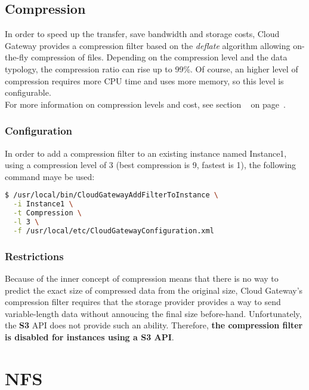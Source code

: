\documentclass[11pt,fleqn,openany]{book} %
\begin{document}
\subsection{Compression}

In order to speed up the transfer, save bandwidth and storage costs, Cloud Gateway provides a compression filter based on the \textit{deflate} algorithm
allowing on-the-fly compression of files. Depending on the compression level and the data typology, the compression ratio can rise up to 99\%.
Of course, an higher level of compression requires more CPU time and uses more memory, so this level is configurable.\\

For more information on compression levels and cost, see section ~ on page~\pageref{sec:performance-compression}.

\subsubsection{Configuration}

In order to add a compression filter to an existing instance named Instance1, using a compression level of 3 (best compression is 9, fastest is 1), the following command maye be used:

\begin{lstlisting}[language=bash]
$ /usr/local/bin/CloudGatewayAddFilterToInstance \
  -i Instance1 \
  -t Compression \
  -l 3 \
  -f /usr/local/etc/CloudGatewayConfiguration.xml
\end{lstlisting}

\subsubsection{Restrictions}

Because of the inner concept of compression means that there is no way to predict the exact size of compressed data from the original size,
Cloud Gateway's compression filter requires that the storage provider provides a way to send variable-length data without annoucing the final
size before-hand. Unfortunately, the \textbf{S3} API does not provide such an ability. Therefore, \textbf{the compression filter is disabled
for instances using a S3 API}.

\section{NFS}
\label{sec:nfs}
\end{document}

